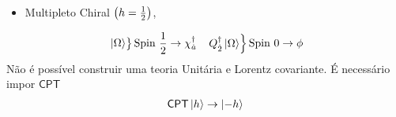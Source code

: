 \documentclass{beamer}
\begin{document}
\begin{frame}
    \begin{itemize}
        \item Multipleto Chiral $\qty(h=\frac12)$,
    \end{itemize}
    \begin{align*}
        &\begin{rcases*}
            \ket\Omega
        \end{rcases*}\textnormal{Spin }\frac12\rightarrow \chi^\dagger_{\dot a}
        &\begin{rcases*}
            Q_{\dot 2}^\dagger\ket\Omega
        \end{rcases*}\textnormal{Spin }0\rightarrow \phi
    \end{align*}\pause
    Não é possível construir uma teoria Unitária e Lorentz covariante. É 
    necessário impor $\mathsf{CPT}$
    \begin{align*}
        \mathsf{CPT}\ket{h}\rightarrow\ket{-h}
    \end{align*}
\end{frame}
\end{document}
